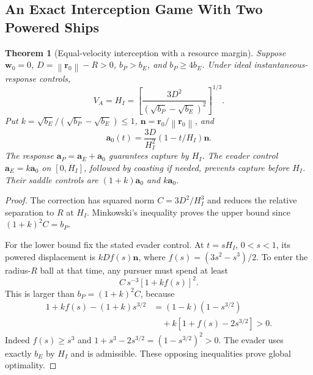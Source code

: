 \documentclass[journal,a4paper]{IEEEtran}
\newtheorem{theorem}{Theorem}
\newcommand{\norm}[1]{\left\|#1\right\|}
\begin{document}
\subsection{An Exact Interception Game With Two Powered Ships}
\begin{theorem}[Equal-velocity interception with a resource margin]
\label{thm:activeinterception}
Suppose $\mathbf w_0=0$, $D=\norm{\mathbf r_0}-R>0$, $b_P>b_E$, and $b_P\ge4b_E$. Under ideal instantaneous-response controls,
\begin{equation}
 \boxed{V_A=H_I=\left[\frac{3D^2}
                  {(\sqrt{b_P}-\sqrt{b_E})^2}\right]^{1/3}.}
 \label{eq:activeIvalue}
\end{equation}
Put $k=\sqrt{b_E}/(\sqrt{b_P}-\sqrt{b_E})\le1$, $\mathbf n=\mathbf r_0/\norm{\mathbf r_0}$, and
\begin{equation}
 \mathbf a_0(t)=\frac{3D}{H_I^2}(1-t/H_I)\mathbf n.
 \label{eq:activeIcontrol}
\end{equation}
The response $\mathbf a_P=\mathbf a_E+\mathbf a_0$ guarantees capture by $H_I$. The evader control $\mathbf a_E=k\mathbf a_0$ on $[0,H_I]$, followed by coasting if needed, prevents capture before $H_I$. Their saddle controls are $(1+k)\mathbf a_0$ and $k\mathbf a_0$.
\end{theorem}
\begin{proof}
The correction has squared norm $C=3D^2/H_I^3$ and reduces the relative separation to $R$ at $H_I$. Minkowski's inequality proves the upper bound since $(1+k)^2C=b_P$.

For the lower bound fix the stated evader control. At $t=sH_I$, $0<s<1$, its powered displacement is $kDf(s)\mathbf n$, where $f(s)=(3s^2-s^3)/2$. To enter the radius-$R$ ball at that time, any pursuer must spend at least
\begin{equation}
 C\,s^{-3}[1+kf(s)]^2.
\end{equation}
This is larger than $b_P=(1+k)^2C$, because
\begin{align}
 1+kf(s)-(1+k)s^{3/2}
  &=(1-k)(1-s^{3/2})\nonumber\\
  &\quad+k[1+f(s)-2s^{3/2}]>0.
\end{align}
Indeed $f(s)\ge s^3$ and $1+s^3-2s^{3/2}=(1-s^{3/2})^2>0$. The evader uses exactly $b_E$ by $H_I$ and is admissible. These opposing inequalities prove global optimality.
\end{proof}
\end{document}
